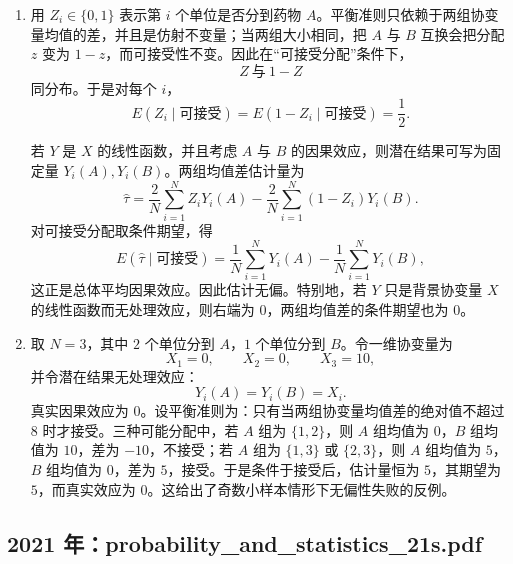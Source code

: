 \documentclass[UTF8,12pt]{ctexart}
\begin{document}
\begin{enumerate}[label=\textbf{\arabic*.},leftmargin=2.2em]
设 \(\phi(t)=E e^{itX}\)，\(\psi(t)=E e^{itY}\)。独立性给出联合特征函数
\[
\Phi(s,t)=\phi(s)\psi(t).
\]
旋转不变性给出
\[
\phi(s)\psi(t)=\phi(s\cos\theta+t\sin\theta)\,
\psi(-s\sin\theta+t\cos\theta).
\]
取对数并在原点附近使用二阶展开
\[
\phi(u)=1-\frac{\sigma^2u^2}{2}+o(u^2),\qquad
\psi(u)=1-\frac{\sigma^2u^2}{2}+o(u^2).
\]
反复应用上述旋转恒等式，相当于把 \((s,t)\) 分解成许多系数趋于 \(0\) 的独立线性项；由于 \(\theta\) 不是 \(90^\circ\) 的整数倍，这些系数的最大绝对值随迭代趋于 \(0\)，而平方和保持为 \(s^2+t^2\)。由 Lindeberg 中心极限定理（或等价地由特征函数乘积极限）得到
\[
\Phi(s,t)=\exp\left\{-\frac{\sigma^2}{2}(s^2+t^2)\right\}.
\]
因此
\[
\phi(s)=e^{-\sigma^2s^2/2},\qquad
\psi(t)=e^{-\sigma^2t^2/2},
\]
即 \(X,Y\) 均为均值 \(0\)、方差 \(\sigma^2\) 的正态随机变量。

\item 用 \(Z_i\in\{0,1\}\) 表示第 \(i\) 个单位是否分到药物 \(A\)。平衡准则只依赖于两组协变量均值的差，并且是仿射不变量；当两组大小相同，把 \(A\) 与 \(B\) 互换会把分配 \(z\) 变为 \(1-z\)，而可接受性不变。因此在“可接受分配”条件下，
\[
Z\ \text{与}\ 1-Z
\]
同分布。于是对每个 \(i\)，
\[
E(Z_i\mid \text{可接受})=E(1-Z_i\mid \text{可接受})=\frac12.
\]

若 \(Y\) 是 \(X\) 的线性函数，并且考虑 \(A\) 与 \(B\) 的因果效应，则潜在结果可写为固定量 \(Y_i(A),Y_i(B)\)。两组均值差估计量为
\[
\hat\tau=\frac{2}{N}\sum_{i=1}^N Z_iY_i(A)
-\frac{2}{N}\sum_{i=1}^N (1-Z_i)Y_i(B).
\]
对可接受分配取条件期望，得
\[
E(\hat\tau\mid \text{可接受})
=\frac1N\sum_{i=1}^N Y_i(A)-\frac1N\sum_{i=1}^N Y_i(B),
\]
这正是总体平均因果效应。因此估计无偏。特别地，若 \(Y\) 只是背景协变量 \(X\) 的线性函数而无处理效应，则右端为 \(0\)，两组均值差的条件期望也为 \(0\)。

\item 取 \(N=3\)，其中 \(2\) 个单位分到 \(A\)，\(1\) 个单位分到 \(B\)。令一维协变量为
\[
X_1=0,\qquad X_2=0,\qquad X_3=10,
\]
并令潜在结果无处理效应：
\[
Y_i(A)=Y_i(B)=X_i.
\]
真实因果效应为 \(0\)。设平衡准则为：只有当两组协变量均值差的绝对值不超过 \(8\) 时才接受。三种可能分配中，若 \(A\) 组为 \(\{1,2\}\)，则 \(A\) 组均值为 \(0\)，\(B\) 组均值为 \(10\)，差为 \(-10\)，不接受；若 \(A\) 组为 \(\{1,3\}\) 或 \(\{2,3\}\)，则 \(A\) 组均值为 \(5\)，\(B\) 组均值为 \(0\)，差为 \(5\)，接受。于是条件于接受后，估计量恒为 \(5\)，其期望为 \(5\)，而真实效应为 \(0\)。这给出了奇数小样本情形下无偏性失败的反例。
\end{enumerate}


\subsection{2021 年：probability\_and\_statistics\_21s.pdf}
\end{document}
